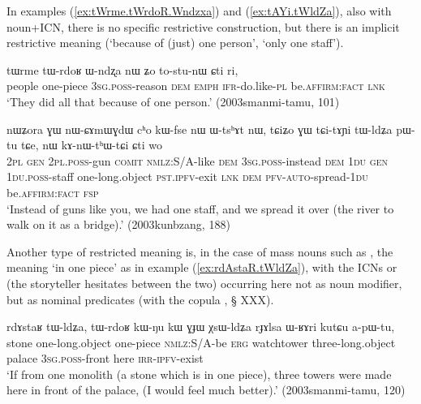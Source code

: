 In examples (\ref{ex:tWrme.tWrdoR.Wndzxa}) and (\ref{ex:tAYi.tWldZa}), also with noun+ICN, there is no specific restrictive construction, but there is an implicit restrictive meaning (`because of (just) one person', `only one staff'). 

\begin{exe}
\ex \label{ex:tWrme.tWrdoR.Wndzxa}
\gll tɯrme tɯ-rdoʁ ɯ-ndʐa nɯ ʑo to-stu-nɯ ɕti ri, \\
people one-piece  \textsc{3sg}.\textsc{poss}-reason \textsc{dem} \textsc{emph} \textsc{ifr}-do.like-\textsc{pl} be.\textsc{affirm}:\textsc{fact} \textsc{lnk} \\
\glt `They did all that because of one person.' (2003smanmi-tamu, 101)
\end{exe} 

\begin{exe}
\ex \label{ex:tAYi.tWldZa}
\gll nɯʑora ɣɯ nɯ-ɕɤmɯɣdɯ cʰo kɯ-fse nɯ ɯ-tsʰɤt nɯ, tɕiʑo ɣɯ tɕi-tɤɲi tɯ-ldʑa pɯ-tu tɕe, nɯ kɤ-nɯ-tʰɯ-tɕi ɕti wo \\
\textsc{2pl} \textsc{gen} \textsc{2pl}.\textsc{poss}-gun \textsc{comit} \textsc{nmlz}:S/A-like \textsc{dem} \textsc{3sg}.\textsc{poss}-instead \textsc{dem}  \textsc{1du} \textsc{gen} \textsc{1du}.\textsc{poss}-staff one-long.object \textsc{pst}.\textsc{ipfv}-exit \textsc{lnk} \textsc{dem} \textsc{pfv}-\textsc{auto}-spread-\textsc{1du} be.\textsc{affirm}:\textsc{fact} \textsc{fsp} \\
\glt `Instead of guns like you, we had one staff, and we spread it over (the river to walk on it as a bridge).' (2003kunbzang, 188)
\end{exe} 

Another type of restricted meaning is, in the case of mass nouns such as , the meaning `in one piece' as in example (\ref{ex:rdAstaR.tWldZa}), with the ICNs  or  (the storyteller hesitates between the two) occurring here not as noun modifier, but as nominal predicates (with the copula , § XXX).

\begin{exe}
\ex \label{ex:rdAstaR.tWldZa}
\gll rdɤstaʁ tɯ-ldʑa, tɯ-rdoʁ kɯ-ŋu kɯ ɣɟɯ χsɯ-ldʑa rɟɤlsa ɯ-ʁɤri kutɕu a-pɯ-tu, \\
stone one-long.object one-piece \textsc{nmlz}:S/A-be \textsc{erg} watchtower three-long.object palace \textsc{3sg}.\textsc{poss}-front here \textsc{irr}-\textsc{ipfv}-exist \\
\glt `If from one monolith (a stone which is in one piece), three  towers were made here in front of the palace, (I would feel much better).'  (2003smanmi-tamu, 120)
\end{exe} 

